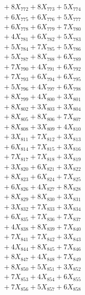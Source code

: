 \documentclass[a4paper,10pt]{article}
\begin{document}
{\begin{align}
&\;  + 8 X_{772} + 8 X_{773} + 5 X_{774} \\[0.3ex]
&\;  + 6 X_{775} + 6 X_{776} + 5 X_{777} \\[0.3ex]
&\;  + 6 X_{778} + 6 X_{779} + 7 X_{780} \\[0.3ex]
&\;  + 4 X_{781} + 6 X_{782} + 5 X_{783} \\[0.3ex]
&\;  + 5 X_{784} + 7 X_{785} + 5 X_{786} \\[0.3ex]
&\;  + 5 X_{787} + 8 X_{788} + 6 X_{789} \\[0.5ex]\allowbreak
&\;  + 7 X_{790} + 4 X_{791} + 6 X_{792} \\[0.3ex]
&\;  + 7 X_{793} + 6 X_{794} + 6 X_{795} \\[0.3ex]
&\;  + 5 X_{796} + 4 X_{797} + 6 X_{798} \\[0.3ex]
&\;  + 8 X_{799} + 4 X_{800} + 3 X_{801} \\[0.3ex]
&\;  + 8 X_{802} + 3 X_{803} + 3 X_{804} \\[0.3ex]
&\;  + 8 X_{805} + 8 X_{806} + 7 X_{807} \\[0.3ex]
&\;  + 8 X_{808} + 3 X_{809} + 4 X_{810} \\[0.3ex]
&\;  + 3 X_{811} + 7 X_{812} + 3 X_{813} \\[0.3ex]
&\;  + 6 X_{814} + 7 X_{815} + 3 X_{816} \\[0.3ex]
&\;  + 7 X_{817} + 7 X_{818} + 3 X_{819} \\[0.5ex]\allowbreak
&\;  + 3 X_{820} + 6 X_{821} + 3 X_{822} \\[0.3ex]
&\;  + 8 X_{823} + 6 X_{824} + 7 X_{825} \\[0.3ex]
&\;  + 6 X_{826} + 4 X_{827} + 8 X_{828} \\[0.3ex]
&\;  + 8 X_{829} + 8 X_{830} + 3 X_{831} \\[0.3ex]
&\;  + 3 X_{832} + 7 X_{833} + 3 X_{834} \\[0.3ex]
&\;  + 6 X_{835} + 7 X_{836} + 7 X_{837} \\[0.3ex]
&\;  + 4 X_{838} + 8 X_{839} + 7 X_{840} \\[0.3ex]
&\;  + 7 X_{841} + 7 X_{842} + 3 X_{843} \\[0.3ex]
&\;  + 4 X_{844} + 8 X_{845} + 7 X_{846} \\[0.3ex]
&\;  + 8 X_{847} + 4 X_{848} + 7 X_{849} \\[0.5ex]\allowbreak
&\;  + 8 X_{850} + 5 X_{851} + 3 X_{852} \\[0.3ex]
&\;  + 7 X_{853} + 4 X_{854} + 6 X_{855} \\[0.3ex]
&\;  + 7 X_{856} + 5 X_{857} + 6 X_{858} \\[0.3ex]

\end{align}}
\end{document}
